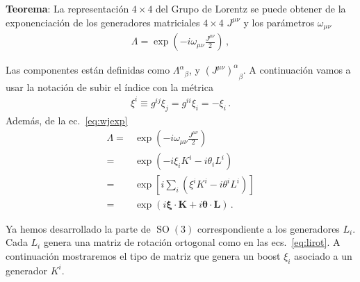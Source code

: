 \begin{frame}
\noindent
\textbf{Teorema}:
  La representación $4\times 4$ del Grupo de Lorentz se puede obtener de la exponenciación de los generadores matriciales $4\times 4$ $J^{\mu\nu}$ y los parámetros $\omega_{\mu\nu}$
\begin{align}
  {\Lambda}=\exp\left(-i\omega_{\mu\nu}\frac{{J}^{\mu\nu}}{2}\right)\,,
\end{align}
\end{frame}
Las componentes están definidas como  ${\Lambda^{\alpha}}_{\beta}$, y ${\left( J^{\mu\nu}\right)^{\alpha}}_{\beta}$.
A continuación vamos a usar la notación de subir el índice con la métrica
\begin{align*}
  \xi^i\equiv g^{ij}\xi_j=g^{ii}\xi_i=-\xi_i\,.
\end{align*}
Además, de la  ec.~\eqref{eq:wjexp} 
\begin{align}
  \label{eq:boostrot}
  \Lambda=&\exp\left(-i\omega_{\mu\nu}\frac{{J}^{\mu\nu}}{2}\right)\nonumber\\
=  &\exp \left(-i \xi_i K^i- i\theta_i L^i \right) \nonumber\\
=  &\exp \left[i \sum_i\left(   \xi^i K^i- i\theta^i L^i \right)\right] \nonumber\\
=&\exp \left(i\boldsymbol{\xi}\cdot \boldsymbol{K}
   + i\boldsymbol{\theta}\cdot \boldsymbol{L}\right)\,.
\end{align}

Ya hemos desarrollado la parte de $\operatorname{SO}(3)$ correspondiente a los generadores $L_i$.
Cada $L_i$ genera una matriz de rotación ortogonal como en las ecs.~\eqref{eq:lirot}.
A continuación mostraremos el tipo de matriz que genera un boost $\xi_i$ asociado  a un generador $K^i$.

